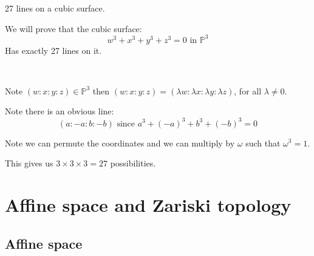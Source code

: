 \begin{example}
    27 lines on a cubic surface.

We will prove that the cubic surface:\begin{equation*}
    w^3+x^3+y^3+z^3 = 0 \text{ in }\mathbb{P}^3
\end{equation*}
Has exactly 27 lines on it.

\

Note $(w\colon x\colon y\colon z)\in \mathbb{P}^3$ then $(w\colon x\colon y\colon z) = (\lambda w\colon \lambda x\colon \lambda y\colon \lambda z)$, for all $\lambda\neq 0$.


Note there is an obvious line:\begin{equation*}
    (a\colon -a \colon b \colon -b) \text{ since }a^3+(-a)^3+b^3+(-b)^3 = 0
\end{equation*}

Note we can permute the coordinates and we can multiply by $\omega$ such that $\omega^3 = 1$.

This gives us $3\times 3 \times 3 = 27$ possibilities.

\end{example} 

\section{Affine space and Zariski topology}

\subsection{Affine space}

